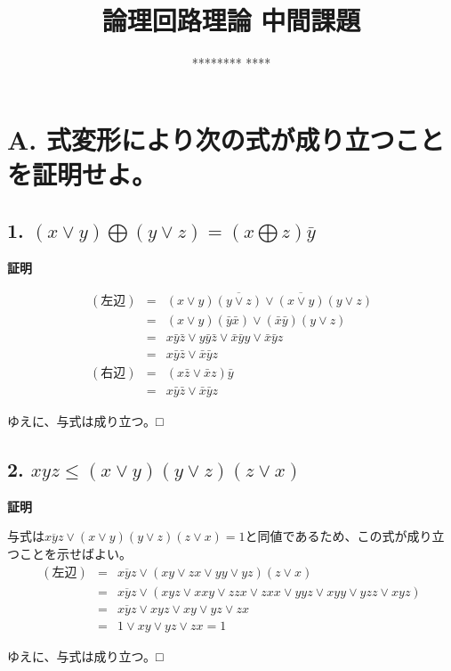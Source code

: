 \documentclass[10pt,dvipdfmx]{jsarticle}
\title{論理回路理論 中間課題}
\author{******** ****}
\date{}
\begin{document}
\maketitle

\section*{A. 式変形により次の式が成り立つことを証明せよ。}

\subsection*{1. $(x \lor y) \bigoplus (y \lor z) = (x \bigoplus z)\bar{y}$}

\textbf{証明}

\begin{eqnarray*}
(左辺) &=& (x \lor y)\overline{(y \lor z)} \lor \overline{(x \lor y)}(y \lor z) \\
&=& (x \lor y)(\bar{y} \bar{x}) \lor (\bar{x} \bar{y})(y \lor z) \\
&=& x\bar{y}\bar{z} \lor y\bar{y}\bar{z} \lor \bar{x}\bar{y}y \lor \bar{x}\bar{y}z \\
&=& x\bar{y}\bar{z} \lor \bar{x}\bar{y}z \\
(右辺) &=& (x\bar{z} \lor \bar{x}z)\bar{y} \\
&=& x\bar{y}\bar{z} \lor \bar{x}\bar{y}z
\end{eqnarray*}

ゆえに、与式は成り立つ。□

\subsection*{2. $xyz \leq (x \lor y)(y \lor z)(z \lor x)$}

\textbf{証明}

与式は$\overline{xyz} \lor (x \lor y)(y \lor z)(z \lor x) = 1$と同値であるため、この式が成り立つことを示せばよい。
\begin{eqnarray*}
(左辺)&=&\overline{xyz} \lor (xy \lor zx \lor yy \lor yz)(z \lor x)\\
&=&\overline{xyz} \lor (xyz \lor xxy \lor zzx \lor zxx \lor yyz \lor xyy \lor yzz \lor xyz) \\
&=&\overline{xyz} \lor xyz \lor xy \lor yz \lor zx \\
&=& 1 \lor xy \lor yz \lor zx = 1
\end{eqnarray*}

ゆえに、与式は成り立つ。□
\end{document}
